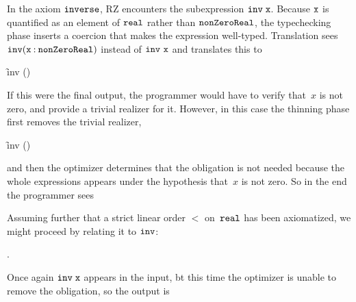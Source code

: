 In the axiom $\mathtt{inverse}$, RZ encounters the subexpression
$\mathtt{inv \;x}$. Because $\mathtt{x}$ is quantified as an element of
$\mathtt{real}$ rather than $\mathtt{nonZeroReal}$, the typechecking
phase inserts a coercion that makes the expression well-typed.
Translation sees $\mathtt{inv}(\mathtt{x} \mathbin{{:}}
\mathtt{nonZeroReal})$ instead of $\f{inv\ x}$ and translates this to
%
\begin{showOutput}
\f{inv} ()
\end{showOutput}%
%
If this were the final output, the programmer would have to verify
that~$x$ is not zero, and provide a trivial realizer for it. However,
in this case the thinning phase first removes the trivial realizer,
%
\iflong
\begin{showOutput}
\f{inv} ()
\end{showOutput}%
\fi %
%
and then the optimizer determines that the obligation is not needed
because the whole expressions appears under the hypothesis that~$x$ is
not zero. So in the end the programmer sees
%
\begin{showOutput}
\end{showOutput}%
%
Assuming further that a strict linear order $<$ on~$\mathtt{real}$ has
been axiomatized, we might proceed by relating it to $\mathtt{inv}$:
%
\begin{showInput}
.
\end{showInput}%
%
Once again $\mathtt{inv\;x}$ appears in the input, bt this time the
optimizer is unable to remove the obligation, so the output is
%
\begin{showOutput}
\\
\qquad
{}
\end{showOutput}
